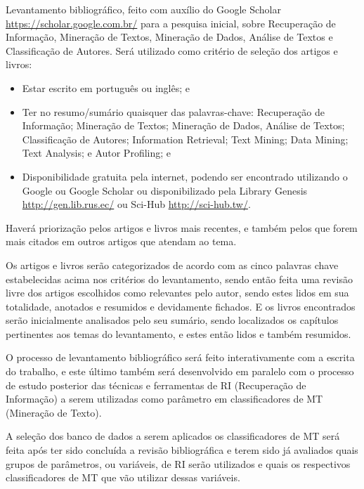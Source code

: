 Levantamento bibliográfico, feito com auxílio do Google Scholar \url{https://scholar.google.com.br/} para a pesquisa inicial, sobre Recuperação de Informação, Mineração de Textos, Mineração de Dados, Análise de Textos e Classificação de Autores.
Será utilizado como critério de seleção dos artigos e livros:
\begin{itemize}
    \item Estar escrito em português ou inglês; e
    \item Ter no resumo/sumário quaisquer das palavras-chave: Recuperação de Informação; Mineração de Textos; Mineração de Dados, Análise de Textos; Classificação de Autores; Information Retrieval; Text Mining; Data Mining; Text Analysis; e Autor Profiling; e
    \item Disponibilidade gratuita pela internet, podendo ser encontrado utilizando o Google ou Google Scholar ou disponibilizado pela Library Genesis \url{http://gen.lib.rus.ec/} ou Sci-Hub \url{http://sci-hub.tw/}.
\end{itemize}
Haverá priorização pelos artigos e livros mais recentes, e também pelos que forem mais citados em outros artigos que atendam ao tema.

Os artigos e livros serão categorizados de acordo com as cinco palavras chave estabelecidas acima nos critérios do levantamento, sendo então feita uma revisão livre dos artigos escolhidos como relevantes pelo autor, sendo estes lidos em sua totalidade, anotados e resumidos e devidamente fichados. E os livros encontrados serão inicialmente analisados pelo seu sumário, sendo localizados os capítulos pertinentes aos temas do levantamento, e estes então lidos e também resumidos.

O processo de levantamento bibliográfico será feito interativamente com a escrita do trabalho, e este último também será desenvolvido em paralelo com o processo de estudo posterior das técnicas e ferramentas de RI (Recuperação de Informação) a serem utilizadas como parâmetro em classificadores de MT (Mineração de Texto).

A seleção dos banco de dados a serem aplicados os classificadores de MT será feita após ter sido concluída a revisão bibliográfica e terem sido já avaliados quais grupos de parâmetros, ou variáveis, de RI serão utilizados e quais os respectivos classificadores de MT que vão utilizar dessas variáveis.